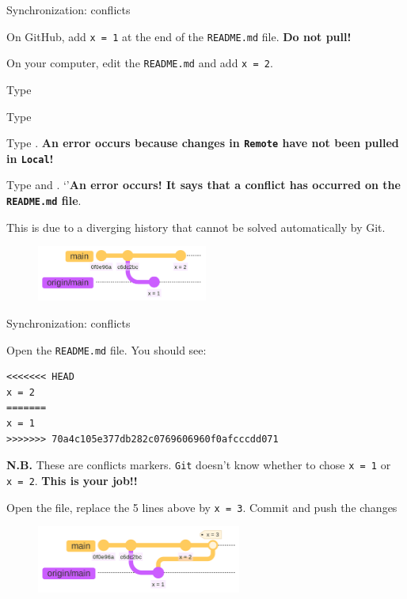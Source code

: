 \documentclass[10pt]{beamer}
\begin{document}
\begin{frame}{Synchronization: conflicts}
\protect\hypertarget{synchronization-conflicts}{}

On GitHub, add \texttt{x\ =\ 1} at the end of the \texttt{README.md}
file. \textbf{Do not pull!}

On your computer, edit the \texttt{README.md} and add
\texttt{x\ =\ 2}.

Type 

Type 

Type . \textbf{An error occurs because changes in
\texttt{Remote} have not been pulled in \texttt{Local}!}

Type  and . `'\textbf{An error occurs! It says that a conflict has occurred on the \texttt{README.md} file}.

This is due to a diverging history that cannot be solved automatically by Git.

\begin{figure}[H]

{\centering \includegraphics[width=0.5\textwidth]{mermaid/mermaid-figure-12.png}

}

\end{figure}
\end{frame}

\begin{frame}[fragile]{Synchronization: conflicts}
\protect\hypertarget{synchronization-conflicts-1}{}

Open the \texttt{README.md} file. You should see:

\begin{verbatim}
<<<<<<< HEAD
x = 2
=======
x = 1
>>>>>>> 70a4c105e377db282c0769606960f0afcccdd071
\end{verbatim}
\textbf{N.B.} These are conflicts markers. \texttt{Git} doesn't know whether to chose
\texttt{x\ =\ 1} or \texttt{x\ =\ 2}. \textbf{This is your job!!}

Open the file, replace the 5 lines above by \texttt{x\ =\ 3}. Commit and push
the changes

\begin{figure}[H]

{\centering \includegraphics[width=0.6\textwidth]{mermaid/mermaid-figure-11.png}

}

\end{figure}
\end{frame}
\end{document}
